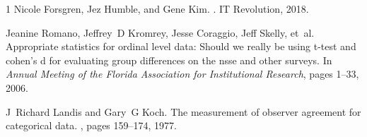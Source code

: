 \documentclass[12pt]{article}
\begin{document}
\begin{thebibliography}{1}
Nicole Forsgren, Jez Humble, and Gene Kim.
.
\newblock IT Revolution, 2018.

Jeanine Romano, Jeffrey~D Kromrey, Jesse Coraggio, Jeff Skelly, et~al.
\newblock Appropriate statistics for ordinal level data: Should we really be using t-test and cohen's d for evaluating group differences on the nsse and other surveys.
\newblock In {\em Annual Meeting of the Florida Association for Institutional Research}, pages 1--33, 2006.

J~Richard Landis and Gary~G Koch.
\newblock The measurement of observer agreement for categorical data.
, pages 159--174, 1977.
\end{thebibliography}
\end{document}
